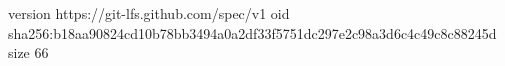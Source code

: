version https://git-lfs.github.com/spec/v1
oid sha256:b18aa90824cd10b78bb3494a0a2df33f5751dc297e2c98a3d6c4c49c8c88245d
size 66
